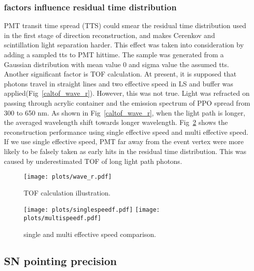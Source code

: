 \documentclass[a4paper,10pt]{cpc-hepnp}
\begin{document}
\subsubsection{factors influence residual time distribution}
PMT transit time spread (TTS) could smear the residual time distribution used
in the first stage of direction reconstruction, and makes Cerenkov and
scintillation light separation harder. This effect was taken into
consideration by adding a sampled tts to PMT hittime. The sample was generated
from a Gaussian distribution with mean value 0 and sigma value the assumed
tts. Another significant factor is TOF calculation. At present, it is supposed
that photons travel in straight lines and two effective speed in LS and buffer
was applied(Fig~\ref{caltof_wave_r}). However, this was not true. Light was
refracted on passing through acrylic container and the emission spectrum of PPO
spread from 300 to 650 nm. As shown in Fig~\ref{caltof_wave_r}, when the light path is
longer, the averaged wavelength shift towards longer wavelength.
Fig~\ref{tof_cor} shows the reconstruction performance using single effective
speed and multi effective speed. If we use single effective speed, PMT far
away from the event vertex were more likely to be falsely taken as early hits
in the residual time distribution. This was caused by underestimated TOF of
long light path photons.
\begin{figure}[htbp]
\centering %
\texttt{[image: plots/wave\_r.pdf]}
\caption{\label{xzcomp} TOF calculation illustration.}
\end{figure}

\begin{figure}[htbp]
\centering %
\texttt{[image: plots/singlespeedf.pdf]}
\hfill
\texttt{[image: plots/multispeedf.pdf]}
\caption{\label{tof_cor} single and multi effective speed comparison.}
\end{figure}
\subsection{SN pointing precision}
\end{document}
